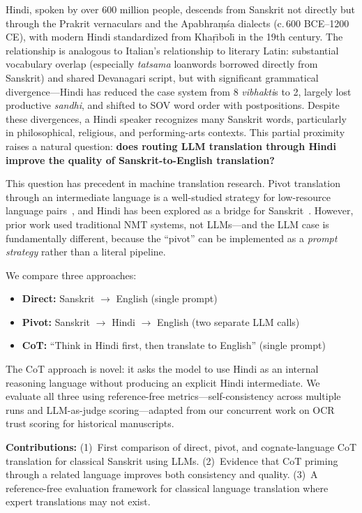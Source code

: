 \documentclass[10pt,twocolumn]{article}
\begin{document}
Hindi, spoken by over 600 million people, descends from Sanskrit not directly but through the Prakrit vernaculars and the Apabhra\d{m}\'sa dialects (c.\,600 BCE--1200 CE), with modern Hindi standardized from Kha\d{r}\={\i}bol\={\i} in the 19th century. The relationship is analogous to Italian's relationship to literary Latin: substantial vocabulary overlap (especially \emph{tatsama} loanwords borrowed directly from Sanskrit) and shared Devanagari script, but with significant grammatical divergence---Hindi has reduced the case system from 8 \emph{vibhakti}s to 2, largely lost productive \emph{sandhi}, and shifted to SOV word order with postpositions. Despite these divergences, a Hindi speaker recognizes many Sanskrit words, particularly in philosophical, religious, and performing-arts contexts. This partial proximity raises a natural question: \textbf{does routing LLM translation through Hindi improve the quality of Sanskrit-to-English translation?}

This question has precedent in machine translation research. Pivot translation through an intermediate language is a well-studied strategy for low-resource language pairs~\cite{wu2007,cheng2017,leng2024}, and Hindi has been explored as a bridge for Sanskrit~\cite{dwivedi2023}. However, prior work used traditional NMT systems, not LLMs---and the LLM case is fundamentally different, because the ``pivot'' can be implemented as a \emph{prompt strategy} rather than a literal pipeline.

We compare three approaches:
\begin{itemize}
\item \textbf{Direct:} Sanskrit $\to$ English (single prompt)
\item \textbf{Pivot:} Sanskrit $\to$ Hindi $\to$ English (two separate LLM calls)
\item \textbf{CoT:} ``Think in Hindi first, then translate to English'' (single prompt)
\end{itemize}

The CoT approach is novel: it asks the model to use Hindi as an internal reasoning language without producing an explicit Hindi intermediate. We evaluate all three using reference-free metrics---self-consistency across multiple runs and LLM-as-judge scoring---adapted from our concurrent work on OCR trust scoring for historical manuscripts.

\textbf{Contributions:} (1)~First comparison of direct, pivot, and cognate-language CoT translation for classical Sanskrit using LLMs. (2)~Evidence that CoT priming through a related language improves both consistency and quality. (3)~A reference-free evaluation framework for classical language translation where expert translations may not exist.
\end{document}
